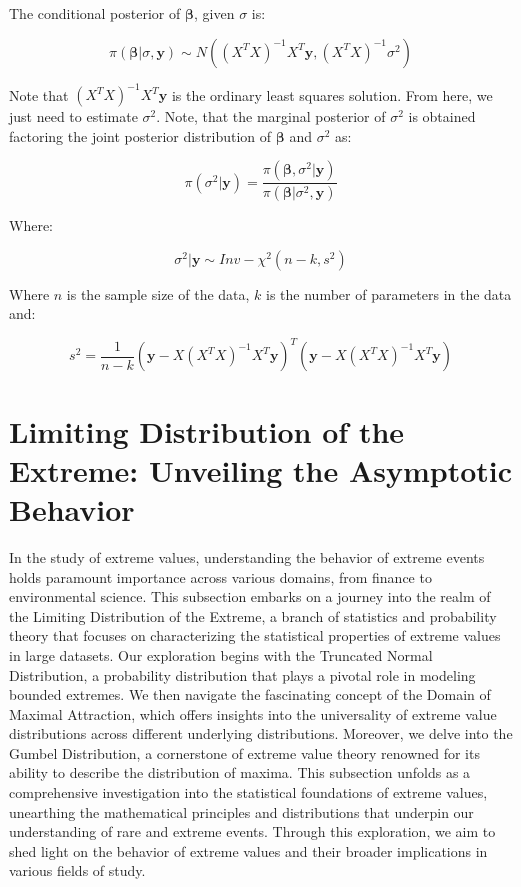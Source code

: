 The conditional posterior of $\bm{\beta}$, given $\sigma$ is:

\begin{equation}
\pi \left( \bm{\beta}|\sigma ,\bm{y} \right) \sim N\left( \left( X^TX \right)^{-1}X^T \bm{y}, \left( X^TX \right)^{-1} \sigma^2 \right)
\label{eq:conditionalPosterior}
\end{equation}

Note that $\left( X^TX \right)^{-1}X^T \bm{y}$ is the ordinary least squares solution. From here, we just need to estimate $\sigma^2$. Note, that the marginal posterior of $\sigma^2$ is obtained factoring the joint posterior distribution of $\bm{\beta}$ and $\sigma^2$ as:

\begin{equation}
\pi \left( \sigma^2|\bm{y} \right) = \frac{\pi\left( \bm{\beta},\sigma^2|\bm{y} \right)}{\pi\left( \bm{\beta}|\sigma^2,\bm{y} \right)}
\label{eq:marginalPosteriorSigma2}
\end{equation}

Where:

\begin{equation}
\sigma^2|\bm{y} \sim Inv-\chi^2 \left(n-k,s^2 \right)
\label{eq:sigma2Giveny}
\end{equation}

Where $n$ is the sample size of the data, $k$ is the number of parameters in the data and:

\begin{equation}
s^2=\frac{1}{n-k}\left(\bm{y}-X\left( X^TX \right)^{-1}X^T \bm{y} \right)^T\left(\bm{y}-X\left( X^TX \right)^{-1}X^T \bm{y} \right) 
\label{eq:s2}
\end{equation}

\section{Limiting Distribution of the Extreme: Unveiling the Asymptotic Behavior}

In the study of extreme values, understanding the behavior of extreme events holds paramount importance across various domains, from finance to environmental science. This subsection embarks on a journey into the realm of the Limiting Distribution of the Extreme, a branch of statistics and probability theory that focuses on characterizing the statistical properties of extreme values in large datasets. Our exploration begins with the Truncated Normal Distribution, a probability distribution that plays a pivotal role in modeling bounded extremes. We then navigate the fascinating concept of the Domain of Maximal Attraction, which offers insights into the universality of extreme value distributions across different underlying distributions. Moreover, we delve into the Gumbel Distribution, a cornerstone of extreme value theory renowned for its ability to describe the distribution of maxima. This subsection unfolds as a comprehensive investigation into the statistical foundations of extreme values, unearthing the mathematical principles and distributions that underpin our understanding of rare and extreme events. Through this exploration, we aim to shed light on the behavior of extreme values and their broader implications in various fields of study.

